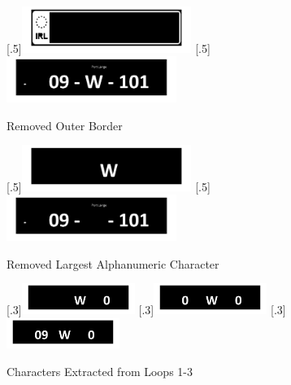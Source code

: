 \documentclass[a4paper]{article}
\begin{document}
	\begin{figure}[H]
		\centering
		[.5\linewidth]{\includegraphics[height=1.5cm]{Results/Q2/NumPlate3/qanumber_plate_3Border.jpg}}%
		[.5\linewidth]{\includegraphics[height=1.5cm]{Results/Q2/NumPlate3/qanumber_plate_3NoBorder.jpg}}%
		\caption{Removed Outer Border}
		\label{fig:}
	\end{figure}
	\begin{figure}[H]
		\centering
		[.5\linewidth]{\includegraphics[height=1.5cm]{Results/Q2/NumPlate3/qanumber_plate_3BigChar.jpg}}%
		[.5\linewidth]{\includegraphics[height=1.5cm]{Results/Q2/NumPlate3/qanumber_plate_3Remain.jpg}}%
		\caption{Removed Largest Alphanumeric Character}
		\label{fig:}
	\end{figure}
	\begin{figure}[H]
		\centering
		[.3\linewidth]{\includegraphics[height=1cm]{Results/Q2/NumPlate3/qanumber_plate_3Added1.jpg}}%
		[.3\linewidth]{\includegraphics[height=1cm]{Results/Q2/NumPlate3/qanumber_plate_3Added2.jpg}}%
		[.3\linewidth]{\includegraphics[height=1cm]{Results/Q2/NumPlate3/qanumber_plate_3Added3.jpg}}%
		\caption{Characters Extracted from Loops 1-3}
		\label{fig:}
	\end{figure}
\end{document}
